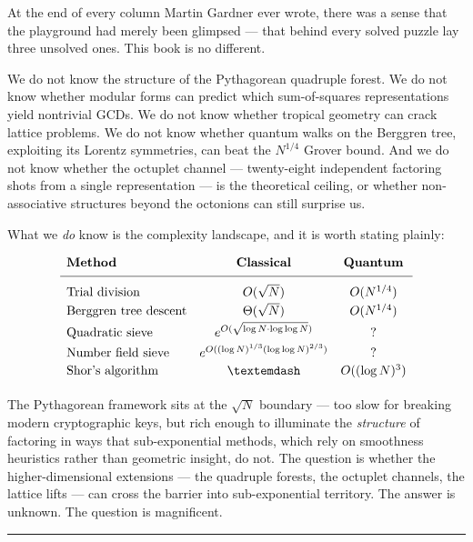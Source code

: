 \documentclass[11pt,openany]{book}
\theoremstyle{definition}
\theoremstyle{plain}
\theoremstyle{remark}
\begin{document}
At the end of every column Martin Gardner ever wrote, there was a sense that the playground had merely been glimpsed — that behind every solved puzzle lay three unsolved ones. This book is no different.

We do not know the structure of the Pythagorean quadruple forest. We do not know whether modular forms can predict which sum-of-squares representations yield nontrivial GCDs. We do not know whether tropical geometry can crack lattice problems. We do not know whether quantum walks on the Berggren tree, exploiting its Lorentz symmetries, can beat the $N^{1/4}$ Grover bound. And we do not know whether the octuplet channel — twenty-eight independent factoring shots from a single representation — is the theoretical ceiling, or whether non-associative structures beyond the octonions can still surprise us.

What we \textit{do} know is the complexity landscape, and it is worth stating plainly:

\[
\begin{array}{lcc}
\textbf{Method} & \textbf{Classical} & \textbf{Quantum} \\[4pt]
\hline
\\[-6pt]
\text{Trial division\index{trial division}} & O(\sqrt{N}) & O(N^{1/4}) \\[2pt]
\text{Berggren tree descent} & \Theta(\sqrt{N}) & O(N^{1/4}) \\[2pt]
\text{Quadratic sieve\index{quadratic sieve}} & e^{O(\sqrt{\log N \cdot \log\log N})} & ? \\[2pt]
\text{Number field sieve\index{number field sieve}} & e^{O((\log N)^{1/3}(\log\log N)^{2/3})} & ? \\[2pt]
\text{Shor's algorithm} & — & O((\log N)^3) \\[2pt]
\end{array}
\]


The Pythagorean framework sits at the $\sqrt{N}$ boundary — too slow for breaking modern cryptographic keys, but rich enough to illuminate the \textit{structure} of factoring in ways that sub-exponential methods, which rely on smoothness heuristics rather than geometric insight, do not. The question is whether the higher-dimensional extensions — the quadruple forests, the octuplet channels, the lattice lifts — can cross the barrier into sub-exponential territory. The answer is unknown. The question is magnificent.

\bigskip\noindent\rule{\textwidth}{0.4pt}\bigskip
\end{document}
